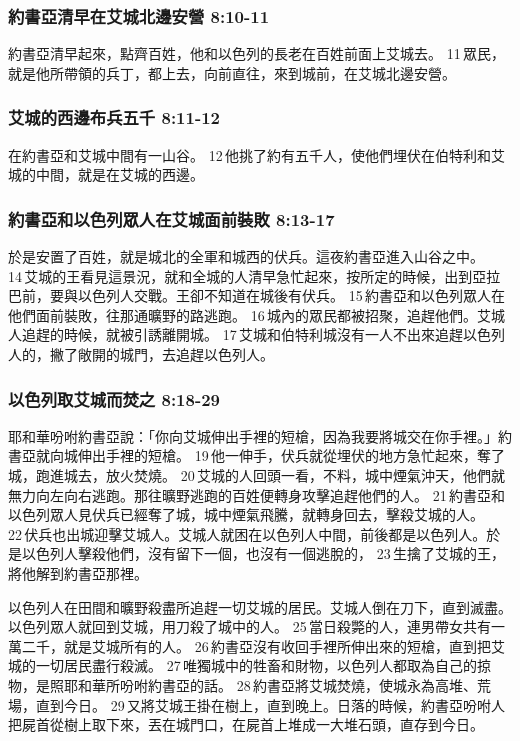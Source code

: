 \subsubsection{約書亞清早在艾城北邊安營 8:10-11}
約書亞清早起來，點齊百姓，他和以色列的長老在百姓前面上艾城去。 11 眾民，就是他所帶領的兵丁，都上去，向前直往，來到城前，在艾城北邊安營。

\subsubsection{艾城的西邊布兵五千 8:11-12}
在約書亞和艾城中間有一山谷。 12 他挑了約有五千人，使他們埋伏在伯特利和艾城的中間，就是在艾城的西邊。

\subsubsection{約書亞和以色列眾人在艾城面前裝敗 8:13-17}
於是安置了百姓，就是城北的全軍和城西的伏兵。這夜約書亞進入山谷之中。 14 艾城的王看見這景況，就和全城的人清早急忙起來，按所定的時候，出到亞拉巴前，要與以色列人交戰。王卻不知道在城後有伏兵。 15 約書亞和以色列眾人在他們面前裝敗，往那通曠野的路逃跑。 16 城內的眾民都被招聚，追趕他們。艾城人追趕的時候，就被引誘離開城。 17 艾城和伯特利城沒有一人不出來追趕以色列人的，撇了敞開的城門，去追趕以色列人。

\subsubsection{以色列取艾城而焚之 8:18-29}
耶和華吩咐約書亞說：「你向艾城伸出手裡的短槍，因為我要將城交在你手裡。」約書亞就向城伸出手裡的短槍。 19 他一伸手，伏兵就從埋伏的地方急忙起來，奪了城，跑進城去，放火焚燒。 20 艾城的人回頭一看，不料，城中煙氣沖天，他們就無力向左向右逃跑。那往曠野逃跑的百姓便轉身攻擊追趕他們的人。 21 約書亞和以色列眾人見伏兵已經奪了城，城中煙氣飛騰，就轉身回去，擊殺艾城的人。 22 伏兵也出城迎擊艾城人。艾城人就困在以色列人中間，前後都是以色列人。於是以色列人擊殺他們，沒有留下一個，也沒有一個逃脫的， 23 生擒了艾城的王，將他解到約書亞那裡。

以色列人在田間和曠野殺盡所追趕一切艾城的居民。艾城人倒在刀下，直到滅盡。以色列眾人就回到艾城，用刀殺了城中的人。 25 當日殺斃的人，連男帶女共有一萬二千，就是艾城所有的人。 26 約書亞沒有收回手裡所伸出來的短槍，直到把艾城的一切居民盡行殺滅。 27 唯獨城中的牲畜和財物，以色列人都取為自己的掠物，是照耶和華所吩咐約書亞的話。 28 約書亞將艾城焚燒，使城永為高堆、荒場，直到今日。 29 又將艾城王掛在樹上，直到晚上。日落的時候，約書亞吩咐人把屍首從樹上取下來，丟在城門口，在屍首上堆成一大堆石頭，直存到今日。

